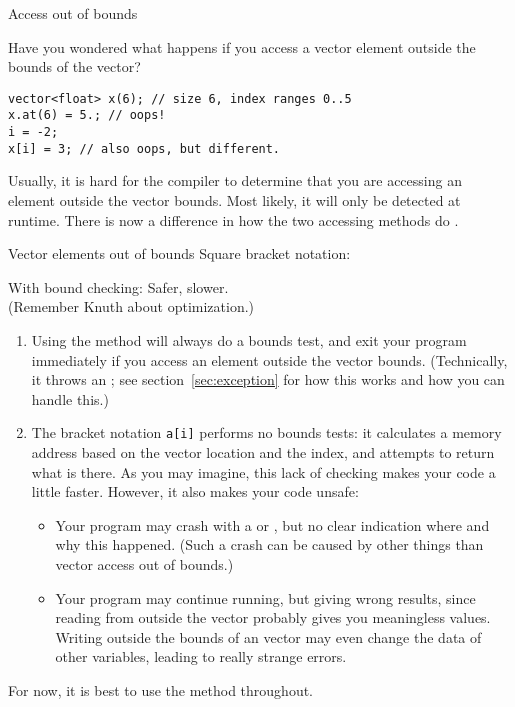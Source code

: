  {Access out of bounds}

Have you wondered what happens if you access a
vector element outside the bounds of the vector?
\begin{lstlisting}
vector<float> x(6); // size 6, index ranges 0..5
x.at(6) = 5.; // oops!
i = -2;
x[i] = 3; // also oops, but different.
\end{lstlisting}
Usually, it is hard for the compiler to determine that you are
accessing an element outside the vector bounds.
Most likely, it will only be detected at runtime.
There is now a difference in how the two accessing methods
do .

\begin{slide}{Vector elements out of bounds}
  \label{sl:vectorsuboob}
  Square bracket notation:

  With bound checking:
  Safer, slower.\\
  (Remember Knuth about optimization.)
\end{slide}

\begin{enumerate}
\item Using the  method will always do a bounds test,
  and exit your program immediately if you access an element
  outside the vector bounds.
  (Technically, it throws an ;
  see section~\ref{sec:exception} for how this works and how you can handle this.)
\item The bracket notation \lstinline{a[i]} performs no bounds tests:
  it calculates a memory address based on the vector location and the index,
  and attempts to return what is there.
  As you may imagine, this lack of checking makes your code a little faster.
  However, it also makes your code unsafe:
  \begin{itemize}
  \item Your program may crash with a 
    or , but no clear indication where and why this happened.
    (Such a crash can be caused by other things than vector access out of bounds.)
  \item Your program may continue running, but  giving wrong results,
    since reading from outside the vector probably gives you meaningless values.
    Writing outside the bounds of an vector may even change the data of other variables,
    leading to really strange errors.
  \end{itemize}
\end{enumerate}
For now, it is best to use the  method throughout.

